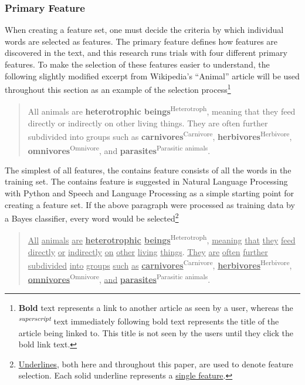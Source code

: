 \subsubsection{Primary Feature}

When creating a feature set, one must decide the criteria by which individual words are selected as features.
The primary feature defines how features are discovered in the text, and this research runs trials with four different primary features.
To make the selection of these features easier to understand, the following slightly modified excerpt from Wikipedia's ``Animal'' article will be used throughout this section as an example of the selection process\footnote{{\bf Bold} text represents a link to another article as seen by a user, whereas the \textsuperscript{\it superscript} text immediately following bold text represents the title of the article being linked to. This title is not seen by the users until they click the bold link text.}

\begin{quote}
All animals are {\bf heterotrophic beings}\textsuperscript{Heterotroph}, meaning that they feed directly or indirectly on other living things. They are often further subdivided into groups such as {\bf carnivores}\textsuperscript{Carnivore}, {\bf herbivores}\textsuperscript{Herbivore}, {\bf omnivores}\textsuperscript{Omnivore}, and {\bf parasites}\textsuperscript{Parasitic animals}.
\end{quote}


The simplest of all features, the contains feature consists of all the words in the training set.
The contains feature is suggested in Natural Language Processing with Python and Speech and Language Processing as a simple starting point for creating a feature set\cite{nlpwp,jurafsky}.
If the above paragraph were processed as training data by a \naive Bayes classifier, every word would be selected\footnote{\underline{Underlines}, both here and throughout this paper, are used to denote feature selection. Each solid underline represents a \underline{single feature}.}

\begin{quote}
\underline{All} \underline{animals} \underline{are} {\bf \underline{heterotrophic} \underline{beings}}\textsuperscript{Heterotroph}, \underline{meaning} \underline{that} \underline{they} \underline{feed} \underline{directly} \underline{or} \underline{indirectly} \underline{on} \underline{other} \underline{living} \underline{things}. \underline{They} \underline{are} \underline{often} \underline{further} \underline{subdivided} \underline{into} \underline{groups} \underline{such} \underline{as} \underline{\bf carnivores}\textsuperscript{Carnivore}, \underline{\bf herbivores}\textsuperscript{Herbivore}, \underline{\bf omnivores}\textsuperscript{Omnivore}, \underline{and} \underline{\bf parasites}\textsuperscript{Parasitic animals}.
\end{quote}


